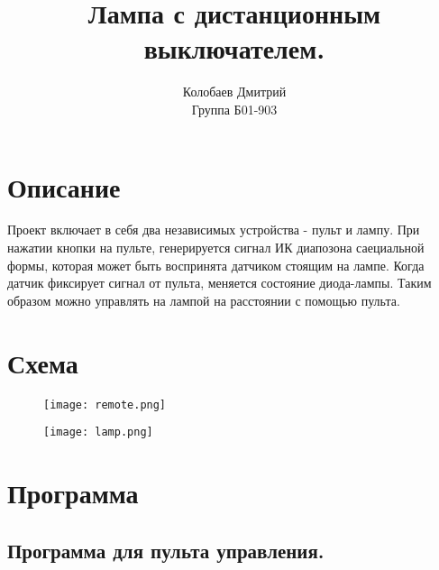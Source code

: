 \documentclass[a4paper,12pt]{article} %
\author{Колобаев Дмитрий\\Группа Б01-903}
\title{Лампа с дистанционным выключателем.} %
\begin{document}
\maketitle

\section*{Описание}
Проект включает в себя два независимых устройства - пульт и лампу. При нажатии кнопки на пульте, генерируется сигнал ИК диапозона саециальной формы, которая может быть воспринята датчиком стоящим на лампе. Когда датчик фиксирует сигнал от пульта, меняется состояние диода-лампы. Таким образом можно управлять на лампой на расстоянии с помощью пульта.

\section*{Схема}
\begin{figure}[h]
\begin{minipage}[b]{0.45\textwidth}
\texttt{[image: remote.png]}
\end{minipage}
\begin{minipage}[b]{0.45\textwidth}
\texttt{[image: lamp.png]}
\end{minipage}
\end{figure}

\newpage

\section*{Программа}

\subsection*{Программа для пульта управления.}
\end{document}
